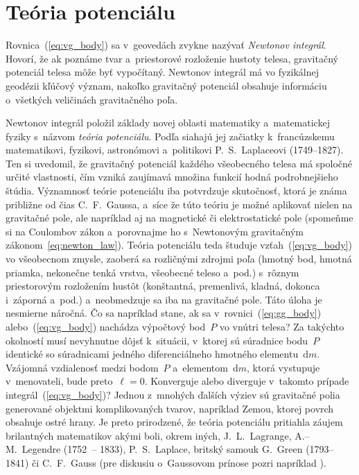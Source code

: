 \documentclass[a4paper, 12pt]{book}
\newcommand{\diff}{\mathrm d}
\begin{document}
\section{Teória potenciálu}
\label{sec:potential_theory}

Rovnica~(\ref{eq:vg_body}) sa v~geovedách zvykne nazývať \emph{Newtonov
integrál}.  Hovorí, že ak poznáme tvar a~priestorové rozloženie hustoty telesa,
gravitačný potenciál telesa môže byť vypočítaný.  Newtonov
integrál má vo fyzikálnej geodézii kľúčový význam, nakoľko gravitačný potenciál 
obsahuje informáciu o~všetkých veličinách gravitačného poľa.

Newtonov integrál položil základy novej oblasti matematiky a~matematickej 
fyziky s~názvom \emph{teória potenciálu}.  Podľa \textcite{MacMillan1930} 
siahajú jej začiatky k~francúzskemu matematikovi, fyzikovi, astronómovi 
a~politikovi P.~S.~Laplaceovi (1749--1827).  Ten si uvedomil, že gravitačný 
potenciál každého všeobecného telesa má spoločné určité vlastnosti, čím vzniká 
zaujímavá množina funkcií hodná podrobnejšieho štúdia.  Významnosť teórie 
potenciálu iba potvrdzuje skutočnosť, ktorá je známa približne od čias 
C.~F.~Gaussa, a~síce že túto teóriu je možné aplikovať nielen na gravitačné 
pole, ale napríklad aj na magnetické či elektrostatické pole (spomeňme si na 
Coulombov zákon a~porovnajme ho s~Newtonovým gravitačným 
zákonom~\ref{eq:newton_law}).  Teória potenciálu teda študuje 
vzťah~(\ref{eq:vg_body}) vo všeobecnom zmysle, zaoberá sa rozličnými zdrojmi 
poľa (hmotný bod, hmotná priamka, nekonečne tenká vrstva, všeobecné teleso 
a~pod.) s~rôznym priestorovým rozložením hustôt (konštantná, premenlivá, 
kladná, dokonca i~záporná a~pod.) a~neobmedzuje sa iba na gravitačné pole.  
Táto úloha je nesmierne náročná.  Čo sa napríklad stane, ak sa 
v~rovnici~(\ref{eq:gg_body}) alebo~(\ref{eq:vg_body}) nachádza výpočtový 
bod~$P$ vo vnútri telesa?  Za takýchto okolností musí nevyhnutne dôjsť 
k~situácii, v~ktorej sú súradnice bodu~$P$ identické so súradnicami jedného 
diferenciálneho hmotného elementu~$\diff m$.  Vzájomná vzdialenosť medzi 
bodom~$P$ a~elementom~$\diff m$, ktorá vystupuje v~menovateli, bude preto~$\ell 
= 0$.  Konverguje alebo diverguje v~takomto prípade 
integrál~(\ref{eq:vg_body})?  Jednou z~mnohých ďalších výziev sú gravitačné 
polia generované objektmi komplikovaných tvarov, napríklad Zemou, ktorej povrch 
obsahuje ostré hrany.  Je preto prirodzené, že teória potenciálu pritiahla 
záujem brilantných matematikov akými boli, okrem iných, J.~L.~Lagrange, 
A.--M.~Legendre (1752~-- 1833), P.~S.~Laplace, britský samouk G.~Green 
(1793--1841) či C.~F.~Gauss (pre diskusiu o~Gaussovom prínose pozri napríklad 
\cite{Freeden2018}).
\end{document}
